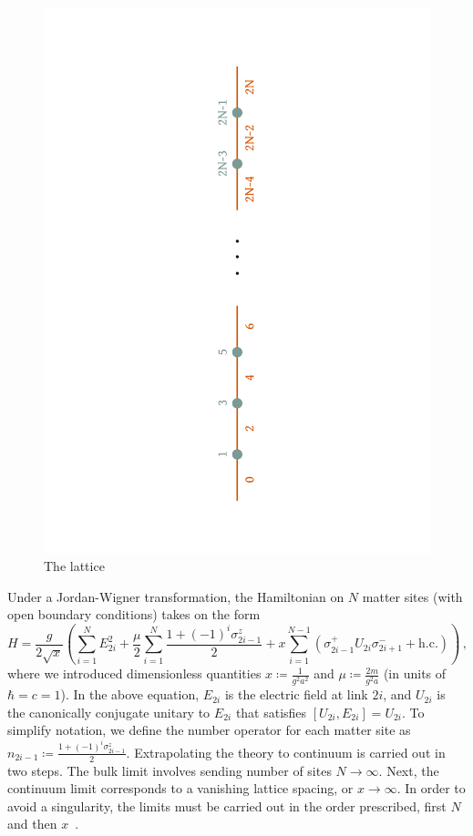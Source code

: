 \documentclass[aps,prl,reprint,superscriptaddress, onecolumn, 11pt]{revtex4-2}
\newcommand{\paren}[1]{\left(#1\right)}
\newcommand{\suml}[3]{\sum_{#1}^{#2}#3}
\newcommand{\pz}[1]{\sigma^{z}_{#1}}
\newcommand{\pplus}[1]{\sigma^{+}_{#1}}
\newcommand{\pminus}[1]{\sigma^{-}_{#1}}
\theoremstyle{definition}
\theoremstyle{definition}
\begin{document}
\begin{figure}[h]
  \centering
  \includegraphics[angle=-90, clip=true, trim=200 0 200 0,  width=\linewidth]{lattice.pdf}
  \caption{The lattice}
  \label{fig:lattice}
\end{figure}
Under a Jordan-Wigner transformation, the Hamiltonian on $N$ matter sites (with open boundary conditions) takes on the form
\begin{equation}
  \label{eq:schwingerH}
  H = \frac{g}{2\sqrt{x}}\paren{\suml{i=1}{N}{E_{2i}^2} + \frac{\mu}{2}\suml{i=1}{N}{\frac{1 + (-1)^i\pz{2i-1}}{2}} + x\suml{i=1}{N-1}{\paren{\pplus{2i-1} U_{2i} \pminus{2i+1} +\mathrm{ h.c.}}}}\, ,
\end{equation}
where we introduced dimensionless quantities $x \coloneqq \frac{1}{g^2a^2}$ and $\mu\coloneqq \frac{2m}{g^2a}$ (in units of  $\hbar = c = 1$). In the above equation, $E_{2i}$ is the electric field at link $2i$, and $U_{2i}$ is the canonically conjugate unitary to $E_{2i}$ that satisfies $[U_{2i}, E_{2i}] = U_{2i}$. To simplify notation, we define the number operator for each matter site as $n_{2i-1}\coloneqq \frac{1 + (-1)^i\pz{2i-1}}{2}$. Extrapolating the theory to continuum is carried out in two steps. The bulk limit involves sending number of sites $N\rightarrow\infty$. Next, the continuum limit corresponds to a vanishing lattice spacing, or $x\rightarrow \infty$. In order to avoid a singularity, the limits must be carried out in the order prescribed, first $N$ and then $x$~\cite{byrnes2003, hamer1982}. 
\end{document}
